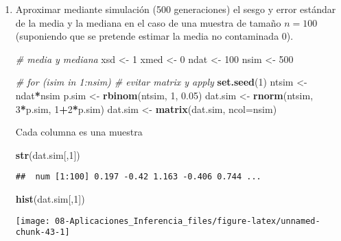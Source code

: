 \documentclass[
]{book}
\newenvironment{Shaded}{\begin{snugshade}}{\end{snugshade}}
\newcommand{\CommentTok}[1]{\textcolor[rgb]{0.56,0.35,0.01}{\textit{#1}}}
\newcommand{\DataTypeTok}[1]{\textcolor[rgb]{0.13,0.29,0.53}{#1}}
\newcommand{\DecValTok}[1]{\textcolor[rgb]{0.00,0.00,0.81}{#1}}
\newcommand{\FloatTok}[1]{\textcolor[rgb]{0.00,0.00,0.81}{#1}}
\newcommand{\KeywordTok}[1]{\textcolor[rgb]{0.13,0.29,0.53}{\textbf{#1}}}
\newcommand{\NormalTok}[1]{#1}
\newcommand{\OperatorTok}[1]{\textcolor[rgb]{0.81,0.36,0.00}{\textbf{#1}}}
\newcommand{\StringTok}[1]{\textcolor[rgb]{0.31,0.60,0.02}{#1}}
\theoremstyle{break}
\theoremstyle{definition}
\theoremstyle{definition}
\theoremstyle{definition}
\theoremstyle{remark}
\begin{document}
\begin{enumerate}
\def\labelenumi{\alph{enumi})}
\item
  Aproximar mediante simulación (500 generaciones) el sesgo y
  error estándar de la media y la mediana en el caso de una
  muestra de tamaño \(n=100\) (suponiendo que se pretende estimar la
  media no contaminada 0).

\begin{Shaded}
\begin{Highlighting}[]
\CommentTok{# media y mediana}
\NormalTok{xsd <-}\StringTok{ }\DecValTok{1}
\NormalTok{xmed <-}\StringTok{ }\DecValTok{0}
\NormalTok{ndat <-}\StringTok{ }\DecValTok{100}
\NormalTok{nsim <-}\StringTok{ }\DecValTok{500}

\CommentTok{# for (isim in 1:nsim) # evitar matrix y apply}
\KeywordTok{set.seed}\NormalTok{(}\DecValTok{1}\NormalTok{)}
\NormalTok{ntsim <-}\StringTok{ }\NormalTok{ndat}\OperatorTok{*}\NormalTok{nsim}
\NormalTok{p.sim <-}\StringTok{ }\KeywordTok{rbinom}\NormalTok{(ntsim, }\DecValTok{1}\NormalTok{, }\FloatTok{0.05}\NormalTok{)}
\NormalTok{dat.sim <-}\StringTok{ }\KeywordTok{rnorm}\NormalTok{(ntsim, }\DecValTok{3}\OperatorTok{*}\NormalTok{p.sim, }\DecValTok{1}\OperatorTok{+}\DecValTok{2}\OperatorTok{*}\NormalTok{p.sim)}
\NormalTok{dat.sim <-}\StringTok{ }\KeywordTok{matrix}\NormalTok{(dat.sim, }\DataTypeTok{ncol=}\NormalTok{nsim)}
\end{Highlighting}
\end{Shaded}

  Cada columna es una muestra

\begin{Shaded}
\begin{Highlighting}[]
\KeywordTok{str}\NormalTok{(dat.sim[,}\DecValTok{1}\NormalTok{])}
\end{Highlighting}
\end{Shaded}

\begin{verbatim}
##  num [1:100] 0.197 -0.42 1.163 -0.406 0.744 ...
\end{verbatim}

\begin{Shaded}
\begin{Highlighting}[]
\KeywordTok{hist}\NormalTok{(dat.sim[,}\DecValTok{1}\NormalTok{])}
\end{Highlighting}
\end{Shaded}

  \begin{center}\texttt{[image: 08-Aplicaciones\_Inferencia\_files/figure-latex/unnamed-chunk-43-1]} \end{center}


\end{enumerate}
\end{document}
